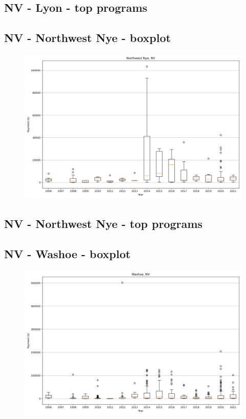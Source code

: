 \subsection*{NV - Lyon - top programs}

\newpage
\subsection*{NV - Northwest Nye - boxplot}
\begin{figure}[h]
\centering
\includegraphics[width=7in]{../output/boxplots/counties/Northwest Nye-NV_boxplot.png}
\end{figure}


\subsection*{NV - Northwest Nye - top programs}

\newpage
\subsection*{NV - Washoe - boxplot}
\begin{figure}[h]
\centering
\includegraphics[width=7in]{../output/boxplots/counties/Washoe-NV_boxplot.png}
\end{figure}


